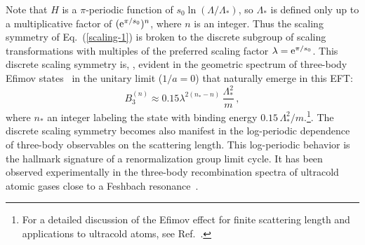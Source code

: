 Note that $H$ is a $\pi$-periodic function of 
$s_0\ln(\Lambda/\Lambda_*)$, so $\Lambda_*$ is defined only up to a 
multiplicative factor of $(\mathrm{e}^{\pi/s_0})^n$, where $n$ is an integer.
Thus the scaling symmetry of Eq.~(\ref{scaling-1}) is broken to
the discrete subgroup of scaling transformations with multiples of
the preferred scaling factor $\lambda=\mathrm{e}^{\pi/s_0}$. This discrete 
scaling symmetry is, \eg, evident in the geometric 
spectrum of three-body Efimov states~\cite{Efimov:1970aa} 
in the unitary limit ($1/a=0$) that naturally emerge in this EFT:
\begin{equation}
 B_3^{(n)}\approx 0.15 \lambda^{2(n_*-n)}\,\frac{\Lambda_*^2}{m}\,,
\end{equation}
where $n_*$ an integer labeling the state
with binding energy  
$0.15\,\Lambda_*^2/m$.\footnote{For a detailed discussion of the Efimov effect
for finite scattering length and applications to ultracold
atoms, see Ref.~\cite{Braaten:2004rn}.}.
The discrete scaling symmetry becomes also manifest in the log-periodic
dependence of three-body observables on the scattering length.
This log-periodic behavior is the hallmark signature of a
renormalization group limit cycle. 
It has been observed experimentally 
in the three-body recombination spectra of ultracold atomic gases 
close to a Feshbach resonance~\cite{Ferlaino:2010viw,PhysRevA.93.022707}.

